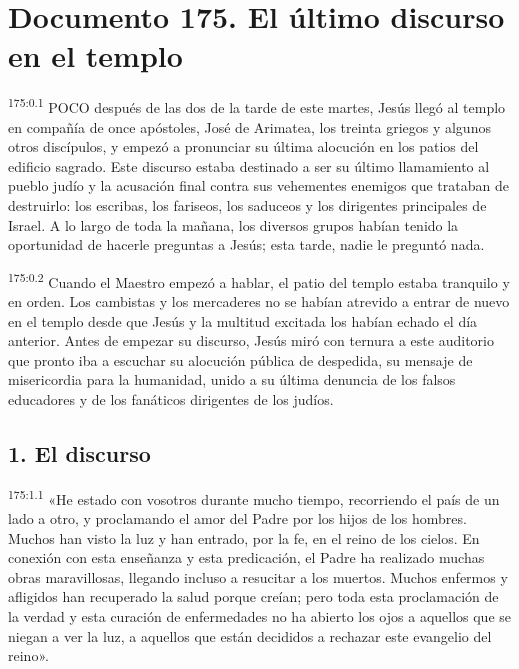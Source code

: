 \chapter{Documento 175. El último discurso en el templo}
\par 
\textsuperscript{175:0.1} POCO después de las dos de la tarde de este martes, Jesús llegó al templo en compañía de once apóstoles, José de Arimatea, los treinta griegos y algunos otros discípulos, y empezó a pronunciar su última alocución en los patios del edificio sagrado. Este discurso estaba destinado a ser su último llamamiento al pueblo judío y la acusación final contra sus vehementes enemigos que trataban de destruirlo: los escribas, los fariseos, los saduceos y los dirigentes principales de Israel. A lo largo de toda la mañana, los diversos grupos habían tenido la oportunidad de hacerle preguntas a Jesús; esta tarde, nadie le preguntó nada.

\par 
\textsuperscript{175:0.2} Cuando el Maestro empezó a hablar, el patio del templo estaba tranquilo y en orden. Los cambistas y los mercaderes no se habían atrevido a entrar de nuevo en el templo desde que Jesús y la multitud excitada los habían echado el día anterior. Antes de empezar su discurso, Jesús miró con ternura a este auditorio que pronto iba a escuchar su alocución pública de despedida, su mensaje de misericordia para la humanidad, unido a su última denuncia de los falsos educadores y de los fanáticos dirigentes de los judíos.

\section*{1. El discurso}
\par 
\textsuperscript{175:1.1} «He estado con vosotros durante mucho tiempo, recorriendo el país de un lado a otro, y proclamando el amor del Padre por los hijos de los hombres. Muchos han visto la luz y han entrado, por la fe, en el reino de los cielos. En conexión con esta enseñanza y esta predicación, el Padre ha realizado muchas obras maravillosas, llegando incluso a resucitar a los muertos. Muchos enfermos y afligidos han recuperado la salud porque creían; pero toda esta proclamación de la verdad y esta curación de enfermedades no ha abierto los ojos a aquellos que se niegan a ver la luz, a aquellos que están decididos a rechazar este evangelio del reino».

